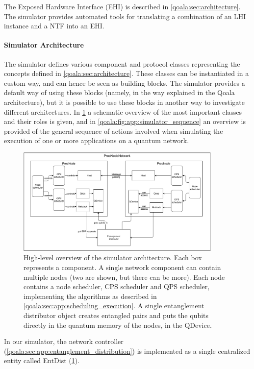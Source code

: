 The Exposed Hardware Interface (EHI) is described in \cref{qoala:sec:architecture}.
The simulator provides automated tools for translating a combination of an LHI instance and a NTF into an EHI.

\paragraph{Simulator Architecture}
The simulator defines various component and protocol classes representing the concepts defined in \cref{qoala:sec:architecture}. These classes can be instantiated in a custom way, and can hence be seen as building blocks. The simulator provides a default way of using these blocks (namely, in the way explained in the Qoala architecture), but it is possible to use these blocks in another way to investigate different architectures.
In \cref{qoala:fig:app:simulator} a schematic overview of the most important classes and their roles is given, and in \cref{qoala:fig:app:simulator_sequence} an overview is provided of the general sequence of actions involved when simulating the execution of one or more applications on a quantum network.


\begin{figure}
    \centering
    \includegraphics[width=0.9\textwidth]{figures/qoala/simulator.pdf}
    \caption{High-level overview of the simulator architecture. Each box represents a component.
    A single network component can contain multiple nodes (two are shown, but there can be more).
    Each node contains a node scheduler, CPS scheduler and QPS scheduler, implementing the algorithms as described in \cref{qoala:sec:app:scheduling_execution}.
    A single entanglement distributor object creates entangled pairs and puts the qubits directly in the quantum memory of the nodes, in the QDevice.
    }
    \label{qoala:fig:app:simulator}
\end{figure}

In our simulator, the network controller (\cref{qoala:sec:app:entanglement_distribution})
is implemented as a single centralized entity called EntDist (\cref{qoala:fig:app:simulator}).



